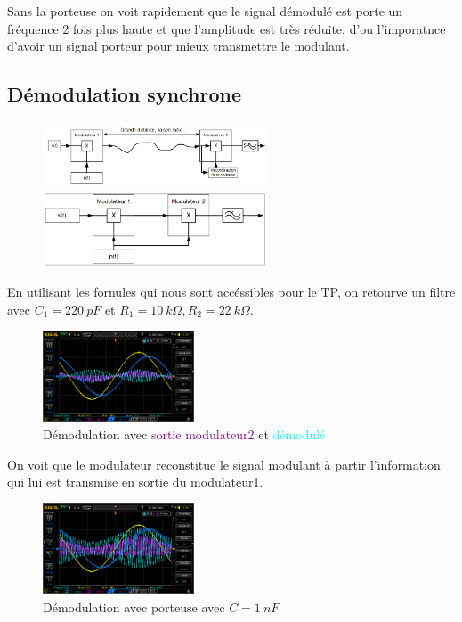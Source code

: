\documentclass[11pt, openright]{book}
\newcommand{\tc}[2]{\textcolor{#1}{#2}}
\begin{document}
Sans la porteuse on voit rapidement que le signal démodulé est porte un fréquence 2 fois plus haute et que l'amplitude est très réduite, d'ou l'imporatnce d'avoir un signal porteur pour mieux transmettre le modulant.

\newpage

\subsection{Démodulation synchrone}

\begin{figure}[ht!]
    \centering
    \includegraphics[width=0.6\textwidth]{./object/c1.png}
    \includegraphics[width=0.6\textwidth]{./object/c2.png}
\end{figure}

En utilisant les fornules qui nous sont accéssibles pour le TP, on retourve un filtre avec $C_1 = 220\ pF$ et $R_1=10\ k\Omega, R_2=22\ k\Omega$.

\begin{figure}[ht!]
    \centering
    \includegraphics[width=0.4\textwidth]{./object/g26.png}
    \caption{Démodulation avec \tc{purple}{sortie modulateur2} et \tc{cyan}{démodulé}}
\end{figure}

On voit que le modulateur reconstitue le signal modulant à partir l'information qui lui est transmise en sortie du modulateur1.

\begin{figure}[ht!]
    \centering
    \includegraphics[width=0.4\textwidth]{./object/g27.png}
    \caption{Démodulation avec porteuse avec $C=1\ nF$}
\end{figure}
\end{document}
